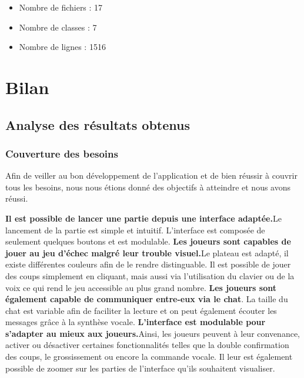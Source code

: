 \documentclass[12pt, openany]{report}
\begin{document}
\begin{itemize}
    \item Nombre de fichiers : 17
    \item Nombre de classes : 7
    \item Nombre de lignes : 1516
\end{itemize}

\chapter{Bilan}
\section{Analyse des résultats obtenus}
\subsection{Couverture des besoins}

Afin de veiller au bon développement de l'application et de bien réussir à couvrir tous les besoins, nous nous étions donné des objectifs à atteindre et nous avons réussi.

\newline
\newline
\textbf{Il est possible de lancer une partie depuis une interface adaptée.}\newlin Le lancement de la partie est simple et intuitif. L'interface est composée de seulement quelques boutons et est modulable.
\newline
\newline
\textbf{Les joueurs sont capables de jouer au jeu d'échec malgré leur trouble visuel.}\newline Le plateau est adapté, il existe différentes couleurs afin de le rendre distinguable. Il est possible de jouer des coups simplement en cliquant, mais aussi via l'utilisation du clavier ou de la voix ce qui rend le jeu accessible au plus grand nombre.
\newline
\newline
\textbf{Les joueurs sont également capable de communiquer entre-eux via le chat}\newline. La taille du chat est variable afin de faciliter la lecture et on peut également écouter les messages grâce à la synthèse vocale.
\newline
\newline
\textbf{L'interface est modulable pour s'adapter au mieux aux joueurs.}\newline Ainsi, les joueurs peuvent à leur convenance, activer ou désactiver certaines fonctionnalités telles que la double confirmation des coups, le grossissement ou encore la commande vocale. Il leur est également possible de zoomer sur les parties de l'interface qu'ils souhaitent visualiser.
\newline
\newline
\end{document}
